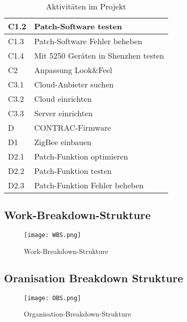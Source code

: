 \begin{table}[H]
\begin{center}
\begin{tabular}{l|l}
            C1.2 & Patch-Software testen                               \\ \hline
            C1.3 & Patch-Software Fehler beheben                       \\ \hline
            C1.4   & Mit 5250 Geräten in Shenzhen testen                             \\ \hline
            C2 & Anpassung Look\&Feel\\\hline
            C3.1 & Cloud-Anbieter suchen                               \\ \hline
            C3.2 & Cloud einrichten                                    \\ \hline
            C3.3 & Server einrichten                                   \\ \hline
            D    & CONTRAC-Firmware                                    \\ \hline
            D1   & ZigBee einbauen                                     \\ \hline
            D2.1 & Patch-Funktion optimieren                           \\ \hline
            D2.2 & Patch-Funktion testen                               \\ \hline
            D2.3 & Patch-Funktion Fehler beheben                       \\
        \end{tabular}
        \caption{Aktivitäten im Projekt}
    \end{center}
\end{table}

\subsection{Work-Breakdown-Strukture}
\begin{figure}[H]
    \begin{center}
        \texttt{[image: WBS.png]}
    \end{center}
    \caption{Work-Breakdown-Strukture}
\end{figure}
\subsection{Oranisation Breakdown Strukture}
\begin{figure}[H]
    \begin{center}
        \texttt{[image: OBS.png]}
    \end{center}
    \caption{Organisation-Breakdown-Strukture}
\end{figure}
